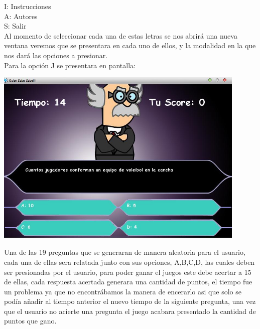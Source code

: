 \documentclass[12pt]{extbook}
\begin{document}
I: Instrucciones \\

A: Autores \\

S: Salir \\

Al momento de seleccionar cada una de estas letras se nos abrirá una
nueva ventana veremos que se presentara en cada uno de ellos, y la
modalidad en la que nos dará las opciones a presionar. \\

Para la opción J se presentara en pantalla:\\

\begin{center}
\includegraphics[width=12cm]{jugar.jpg}
\end{center}

Una de las 19 preguntas que se generaran de manera aleatoria para
el usuario, cada una de ellas sera relatada junto con sus opciones,
A,B,C,D, las cuales deben ser presionadas por el usuario, para poder
ganar el juegos este debe acertar a 15 de ellas, cada respuesta acertada
generara una cantidad de puntos, el tiempo fue un problema ya que
no encontrábamos la manera de encerarlo asi que solo se podía añadir
al tiempo anterior el nuevo tiempo de la siguiente pregunta, una vez
que el usuario no acierte una pregunta el juego acabara presentado
la cantidad de puntos que gano.\\
\end{document}
